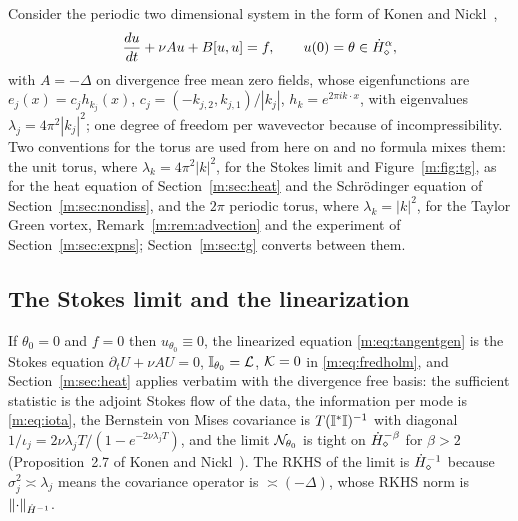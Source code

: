 Consider the periodic two dimensional system in the form of Konen and Nickl~\cite{konennickl2026},
\begin{equation}\label{m:eq:nsproj}
\frac{du}{dt}+\nu Au+B[u,u]=f,\qquad u(0)=\theta\in\dot H^{\alpha}_\diamond,
\end{equation}
with $A=-\Delta$ on divergence free mean zero fields, whose eigenfunctions are $e_j(x)=c_jh_{k_j}(x)$, $c_j=(-k_{j,2},k_{j,1})/|k_j|$, $h_k=e^{2\pi ik\cdot x}$, with eigenvalues $\lambda_j=4\pi^2|k_j|^2$; one degree of freedom per wavevector because of incompressibility. Two conventions for the torus are used from here on and no formula mixes them: the unit torus, where $\lambda_k=4\pi^2|k|^2$, for the Stokes limit and Figure~\ref{m:fig:tg}, as for the heat equation of Section~\ref{m:sec:heat} and the Schr\"odinger equation of Section~\ref{m:sec:nondiss}, and the $2\pi$ periodic torus, where $\lambda_k=|k|^2$, for the Taylor Green vortex, Remark~\ref{m:rem:advection} and the experiment of Section~\ref{m:sec:expns}; Section~\ref{m:sec:tg} converts between them.

\subsection{The Stokes limit and the linearization}

If $\theta_0=0$ and $f=0$ then $u_{\theta_0}\equiv0$, the linearized equation \eqref{m:eq:tangentgen} is the Stokes equation $\partial_tU+\nu AU=0$, $\mathbb{I}_{\theta_0}=\mathcal{L}$, $\mathcal{K}=0$ in \eqref{m:eq:fredholm}, and Section~\ref{m:sec:heat} applies verbatim with the divergence free basis: the sufficient statistic is the adjoint Stokes flow of the data, the information per mode is \eqref{m:eq:iota}, the Bernstein von Mises covariance is $T(\mathbb{I}^*\mathbb{I})^{-1}$ with diagonal $1/\iota_j=2\nu\lambda_jT/(1-e^{-2\nu\lambda_jT})$, and the limit $\mathcal{N}_{\theta_0}$ is tight on $\dot H^{-\beta}_\diamond$ for $\beta>2$ (Proposition~2.7 of Konen and Nickl~\cite{konennickl2026}). The RKHS of the limit is $\dot H^{-1}_\diamond$ because $\sigma_j^2\asymp\lambda_j$ means the covariance operator is $\asymp(-\Delta)$, whose RKHS norm is $\left\|\cdot\right\|_{\dot H^{-1}}$.

